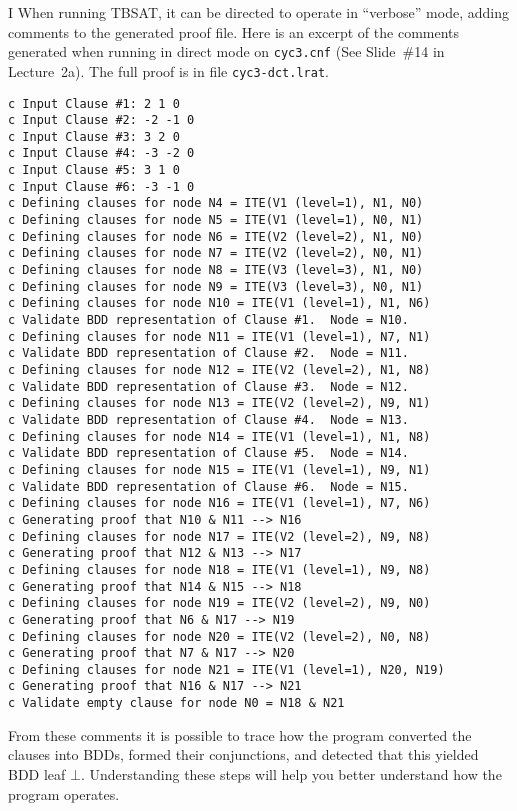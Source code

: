 \begin{problem}{I}
When running TBSAT, it can be directed to operate in ``verbose'' mode, adding comments to the generated proof file.
Here is an excerpt of the comments generated when running in direct mode on \texttt{cyc3.cnf} (See Slide~\#14 in Lecture~2a).
The full proof is in file \texttt{cyc3-dct.lrat}.
\begin{lstlisting}
c Input Clause #1: 2 1 0
c Input Clause #2: -2 -1 0
c Input Clause #3: 3 2 0
c Input Clause #4: -3 -2 0
c Input Clause #5: 3 1 0
c Input Clause #6: -3 -1 0
c Defining clauses for node N4 = ITE(V1 (level=1), N1, N0)
c Defining clauses for node N5 = ITE(V1 (level=1), N0, N1)
c Defining clauses for node N6 = ITE(V2 (level=2), N1, N0)
c Defining clauses for node N7 = ITE(V2 (level=2), N0, N1)
c Defining clauses for node N8 = ITE(V3 (level=3), N1, N0)
c Defining clauses for node N9 = ITE(V3 (level=3), N0, N1)
c Defining clauses for node N10 = ITE(V1 (level=1), N1, N6)
c Validate BDD representation of Clause #1.  Node = N10.
c Defining clauses for node N11 = ITE(V1 (level=1), N7, N1)
c Validate BDD representation of Clause #2.  Node = N11.
c Defining clauses for node N12 = ITE(V2 (level=2), N1, N8)
c Validate BDD representation of Clause #3.  Node = N12.
c Defining clauses for node N13 = ITE(V2 (level=2), N9, N1)
c Validate BDD representation of Clause #4.  Node = N13.
c Defining clauses for node N14 = ITE(V1 (level=1), N1, N8)
c Validate BDD representation of Clause #5.  Node = N14.
c Defining clauses for node N15 = ITE(V1 (level=1), N9, N1)
c Validate BDD representation of Clause #6.  Node = N15.
c Defining clauses for node N16 = ITE(V1 (level=1), N7, N6)
c Generating proof that N10 & N11 --> N16
c Defining clauses for node N17 = ITE(V2 (level=2), N9, N8)
c Generating proof that N12 & N13 --> N17
c Defining clauses for node N18 = ITE(V1 (level=1), N9, N8)
c Generating proof that N14 & N15 --> N18
c Defining clauses for node N19 = ITE(V2 (level=2), N9, N0)
c Generating proof that N6 & N17 --> N19
c Defining clauses for node N20 = ITE(V2 (level=2), N0, N8)
c Generating proof that N7 & N17 --> N20
c Defining clauses for node N21 = ITE(V1 (level=1), N20, N19)
c Generating proof that N16 & N17 --> N21
c Validate empty clause for node N0 = N18 & N21
\end{lstlisting}

From these comments it is possible to trace how the program converted
the clauses into BDDs, formed their conjunctions, and detected that
this yielded BDD leaf $\bot$.  Understanding these steps will help you
better understand how the program operates.


\end{problem}
